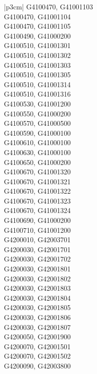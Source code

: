 \begin{customLongTable}{ |p{3cm}| }
G4100470, G41001103 \\ \hline
G4100470, G41001104 \\ \hline
G4100470, G41001105 \\ \hline
G4100490, G41000200 \\ \hline
G4100510, G41001301 \\ \hline
G4100510, G41001302 \\ \hline
G4100510, G41001303 \\ \hline
G4100510, G41001305 \\ \hline
G4100510, G41001314 \\ \hline
G4100510, G41001316 \\ \hline
G4100530, G41001200 \\ \hline
G4100550, G41000200 \\ \hline
G4100570, G41000500 \\ \hline
G4100590, G41000100 \\ \hline
G4100610, G41000100 \\ \hline
G4100630, G41000100 \\ \hline
G4100650, G41000200 \\ \hline
G4100670, G41001320 \\ \hline
G4100670, G41001321 \\ \hline
G4100670, G41001322 \\ \hline
G4100670, G41001323 \\ \hline
G4100670, G41001324 \\ \hline
G4100690, G41000200 \\ \hline
G4100710, G41001200 \\ \hline
G4200010, G42003701 \\ \hline
G4200030, G42001701 \\ \hline
G4200030, G42001702 \\ \hline
G4200030, G42001801 \\ \hline
G4200030, G42001802 \\ \hline
G4200030, G42001803 \\ \hline
G4200030, G42001804 \\ \hline
G4200030, G42001805 \\ \hline
G4200030, G42001806 \\ \hline
G4200030, G42001807 \\ \hline
G4200050, G42001900 \\ \hline
G4200070, G42001501 \\ \hline
G4200070, G42001502 \\ \hline
G4200090, G42003800 \\ \hline

\end{customLongTable}
